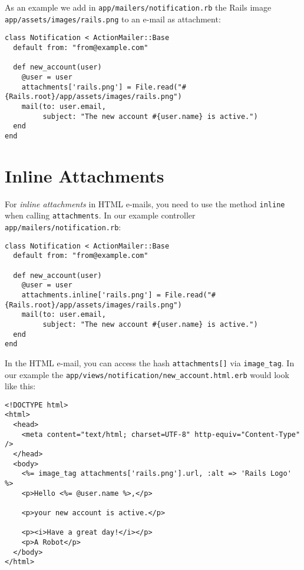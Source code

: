 \documentclass[a4paper]{book}
\newcommand{\chap}[1]{\newpage\thispagestyle{empty}\chapter{#1}\label{chap:\thechapter}}
\begin{document}
As an example we add in \texttt{app/mailers/notification.rb} the Rails image \texttt{app/assets/images/rails.png} to an e-mail as attachment:

\begin{shaded}\begin{verbatim}
class Notification < ActionMailer::Base
  default from: "from@example.com"

  def new_account(user)
    @user = user
    attachments['rails.png'] = File.read("#{Rails.root}/app/assets/images/rails.png")
    mail(to: user.email,
         subject: "The new account #{user.name} is active.")
  end
end
\end{verbatim}\end{shaded}

\chap{Inline Attachments}\label{inline-attachments}

For \emph{inline attachments} in HTML e-mails, you need to use the method \texttt{inline} when calling \texttt{attachments}. In our example controller \texttt{app/mailers/notification.rb}:

\begin{shaded}\begin{verbatim}
class Notification < ActionMailer::Base
  default from: "from@example.com"

  def new_account(user)
    @user = user
    attachments.inline['rails.png'] = File.read("#{Rails.root}/app/assets/images/rails.png")
    mail(to: user.email,
         subject: "The new account #{user.name} is active.")
  end
end
\end{verbatim}\end{shaded}

In the HTML e-mail, you can access the hash \texttt{attachments{[}{]}} via \texttt{image\_tag}. In our example the \texttt{app/views/notification/new\_account.html.erb} would look like this:

\begin{shaded}\begin{verbatim}
<!DOCTYPE html>
<html>
  <head>
    <meta content="text/html; charset=UTF-8" http-equiv="Content-Type" />
  </head>
  <body>
    <%= image_tag attachments['rails.png'].url, :alt => 'Rails Logo' %>
    <p>Hello <%= @user.name %>,</p>

    <p>your new account is active.</p>

    <p><i>Have a great day!</i></p>
    <p>A Robot</p>
  </body>
</html>
\end{verbatim}\end{shaded}
\end{document}
